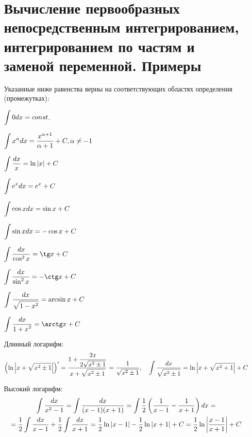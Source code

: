 \section{Вычисление первообразных непосредственным интегрированием, интегрированием по частям и заменой переменной. Примеры}

Указанные ниже равенства верны на соответствующих областях определения (промежутках):

\begin{enumerate}
    \begin{minipage}{.33\textwidth}
        \item $\displaystyle\int 0dx = const$.
        \item $\displaystyle\int x^\alpha dx = \frac{x^{\alpha + 1}}{\alpha + 1} + C, \alpha \ne -1$
        \item $\displaystyle\int\frac{dx}{x} = \ln\left\lvert x\right\rvert + C$
    \end{minipage}
    \begin{minipage}{.33\textwidth}
        \item $\displaystyle\int e^xdx = e^x + C$
        \item $\displaystyle\int\cos xdx = \sin x + C$
        
            $\displaystyle\int\sin xdx = -\cos x + C$
    \end{minipage}
    \begin{minipage}{.33\textwidth}
        \item $\ds\int \frac{dx}{\cos^2x} = \tg x + C$

            $\ds\int \frac{dx}{\sin^2x} = -\ctg x + C$
        \item $\displaystyle\int\frac{\displaystyle dx}{\displaystyle \sqrt{1 - x^2}} = \arcsin x + C$

            $\ds\int\ddfrac{dx}{1 + x^2} = \arctg x + C$
    \end{minipage}
    \item Длинный логарифм:
        \[
            \left(\ln\left\lvert x + \sqrt{x^2 \pm 1}\right\rvert\right)^\prime = \frac{\displaystyle 1 + \frac{2x}{2\sqrt{x^2 \pm 1}}}{\displaystyle x + \sqrt{x^2 \pm 1}} = \frac{1}{\sqrt{x^2 \pm 1}},\quad \int\frac{\displaystyle dx}{\displaystyle \sqrt{x^2 \pm 1}} = \ln\left\lvert x + \sqrt{x^2 + 1}\right\rvert + C
        \]

        Высокий логарифм:
        \begin{multline*}
            \int\frac{dx}{x^2 - 1} = \int\frac{dx}{(x - 1)(x + 1)} = \int\frac{1}{2}\left(\frac{1}{x - 1} - \frac{1}{x + 1}\right)dx =\\ = \frac{1}{2}\int\frac{dx}{x - 1} + \frac{1}{2}\int\frac{dx}{x + 1} = \frac{1}{2}\ln\left\lvert x - 1\right\rvert - \frac{1}{2}\ln\left\lvert x + 1\right\rvert + C = \frac{1}{2}\ln\left\lvert\frac{x - 1}{x + 1}\right\rvert + C
        \end{multline*}
\end{enumerate}

